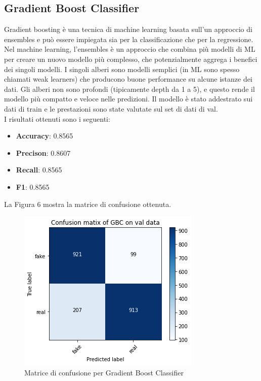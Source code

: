 \documentclass{article}
\begin{document}
\subsection{Gradient Boost Classifier}
Gradient boosting è una tecnica di machine learning basata sull'un approccio di ensembles e può essere impiegata sia per la classificazione che per la regressione. Nel machine learning, l'ensembles è un approccio che combina più modelli di ML per creare un nuovo modello più complesso, che potenzialmente aggrega i benefici dei singoli modelli.
I singoli alberi sono modelli semplici (in ML sono spesso chiamati weak learners) che producono buone performance su alcune istanze dei dati. Gli alberi non sono profondi (tipicamente depth da 1 a 5), e questo rende il modello più compatto e veloce nelle predizioni. Il modello è stato addestrato sui dati di train e le prestazioni sono state valutate sul set di dati di val. \\
I risultati ottenuti sono i seguenti:
\begin{itemize}[noitemsep]
  \item \textbf{Accuracy}: 0.8565
  \item \textbf{Precison}: 0.8607
  \item \textbf{Recall}: 0.8565
  \item \textbf{F1}: 0.8565
 \end{itemize}

\noindent
La Figura 6 mostra la matrice di confusione ottenuta.
\begin{figure}[H]
\includegraphics[width=0.5\linewidth]{GBC.png}
\centering
\caption{Matrice di confusione per Gradient Boost Classifier}
\label{fig:bytepost}
\end{figure}
\end{document}
